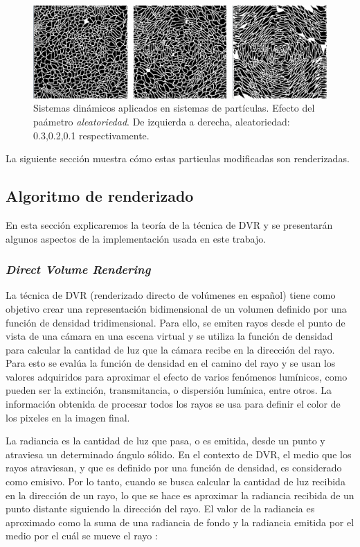 \documentclass[oneside,a4paper,spanish,links]{amca}
\begin{document}
\begin{figure}[htb!]
  \centerline{\includegraphics[scale=0.21]{fig4}}
  \caption{Sistemas din\'amicos aplicados en sistemas de part\'iculas. Efecto del pa\'ametro {\em aleatoriedad}. De izquierda a derecha, aleatoriedad: 0.3,0.2,0.1 respectivamente. }
  \label{fg:fig4}
\end{figure}

La siguiente secci\'on muestra c\'omo estas particulas modificadas son renderizadas.

\subsection{Algoritmo de renderizado}

En esta sección explicaremos la teoría de la técnica de DVR y se
presentarán algunos aspectos de la implementación usada en este
trabajo.

\subsubsection{\emph{Direct Volume Rendering}}

La técnica de DVR (renderizado directo de volúmenes en español) tiene
como objetivo crear una representación bidimensional de un vo\-lu\-men
definido por una función de densidad tridimensional. Para ello, se
emiten rayos desde el punto de vista de una cámara en una escena
virtual y se utiliza la función de densidad para calcular la cantidad
de luz que la cámara recibe en la dirección del rayo. Para esto se
evalúa la función de densidad en el camino del rayo y se usan los
valores adquiridos para aproximar el efecto de varios fenómenos
lumínicos, como pueden ser la extinción, transmitancia, o dispersión
lumínica, entre otros. La información obtenida de procesar todos los
rayos se usa para definir el color de los pixeles en la imagen final.

La radiancia es la cantidad de luz que pasa, o es emitida, desde un
punto y atraviesa un determinado ángulo sólido. En el contexto de DVR,
el medio que los rayos atraviesan, y que es definido por una función
de densidad, es considerado como emisivo. Por lo tanto, cuando se
busca calcular la cantidad de luz recibida en la dirección de un rayo,
lo que se hace es aproximar la radiancia recibida de un punto distante
siguiendo la dirección del rayo. El valor de la radiancia es
aproximado como la suma de una radiancia de fondo y la radiancia
emitida por el medio por el cuál se mueve el rayo \citep{Kratz2006} :
\end{document}

